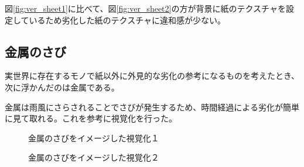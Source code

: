 図\ref{fig:ver_sheet1}に比べて、図\ref{fig:ver_sheet2}の方が背景に紙のテクスチャを設定しているため劣化した紙のテクスチャに違和感が少ない。

\subsection{金属のさび}
\label{subsec:ver_tex_russet}

実世界に存在するモノで紙以外に外見的な劣化の参考になるものを考えたとき、次に浮かんだのは金属である。

金属は雨風にさらされることでさびが発生するため、時間経過による劣化が簡単に見て取れる。これを参考に視覚化を行った。

\begin{figure}[htbp]
  \begin{minipage}{0.5\hsize}
    \begin{center}
    \end{center}
    \caption{金属のさびをイメージした視覚化１}
    \label{fig:ver_russet1}
  \end{minipage}
  \begin{minipage}{0.5\hsize}
    \begin{center}
    \end{center}
    \caption{金属のさびをイメージした視覚化２}
    \label{fig:ver_russet2}
  \end{minipage}
\end{figure}

